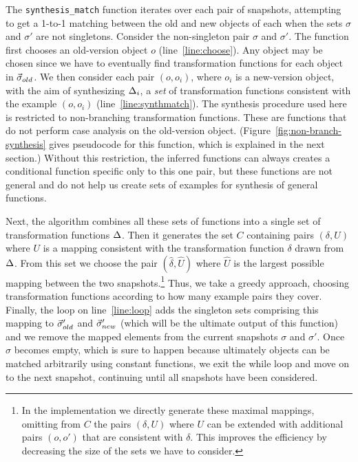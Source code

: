 \documentclass[natbib]{sigplanconf}
\newcommand{\code}[1]{\lstinline|#1|\xspace}
\begin{document}
The \code{synthesis_match} function iterates over each pair of
snapshots, attempting to get a 1-to-1 matching between the old and new
objects of each when the sets $\sigma$ and $\sigma'$ are not singletons.  %
Consider the non-singleton pair $\sigma$ and $\sigma'$. The function
first chooses an old-version object $o$ (line~\ref{line:choose}).  Any
object may be chosen since we have to eventually find transformation functions
for each object in $\vec{\sigma}_{old}$.  We then consider each pair
$(o,o_i)$, where $o_i$ is a new-version object, with the aim of
synthesizing $\Delta_i$, a \emph{set} of transformation functions consistent
with the example $(o,o_i)$ (line~\ref{line:synthmatch}). The synthesis
procedure used here is restricted to non-branching transformation functions.
These are functions that do not perform case analysis on the
old-version object.  (Figure~\ref{fig:non-branch-synthesis} gives
pseudocode for this function, which is explained in the next section.)
Without this restriction, the inferred functions can always 
creates a conditional function specific only to this one pair, but
these functions are not general and do not help us create sets of
examples for synthesis of general functions.

Next, the algorithm combines all these sets of functions into a single
set of transformation functions $\Delta$.  Then it generates the set $C$
containing pairs $(\delta,U)$ where $U$ is a mapping consistent with
the transformation function $\delta$ drawn from $\Delta$.  From this
set we choose the pair $(\hat{\delta},\hat{U})$ where $\hat{U}$ is the
largest possible mapping between the two snapshots.\footnote{In the implementation
we directly generate these maximal mappings, omitting from $C$ the
pairs $(\delta,U)$ where $U$ can be extended with additional pairs $(o,o')$
that are consistent with $\delta$.  This improves the efficiency by decreasing
the size of the sets we have to consider.}
Thus, we take a
greedy approach, choosing transformation functions according to how many
example pairs they cover.
Finally, the loop on line~\ref{line:loop} adds the singleton sets comprising this mapping to
$\vec{\sigma}'_{old}$ and $\vec{\sigma}'_{new}$ (which will be the ultimate
output of this function) and we remove the mapped elements from the
current snapshots $\sigma$ and $\sigma'$.  Once $\sigma$ becomes
empty, which is sure to happen because ultimately objects can be
matched arbitrarily using constant functions,
we exit the while loop and move on to the next snapshot, continuing
until all snapshots have been considered.
\end{document}

